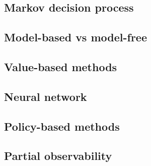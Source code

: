 \subsection{Markov decision process} \label{sec:ch2_mdp}
\subsection{Model-based vs model-free} \label{sec:ch2_model_based_vs_model_free}
\subsection{Value-based methods} \label{sec:ch2_value_based_methods}
\subsection{Neural network} \label{sec:ch2_neural_network}
\subsection{Policy-based methods} \label{sec:ch2_policy_based_methods}
\subsection{Partial observability} \label{sec:ch2_partial_observability}